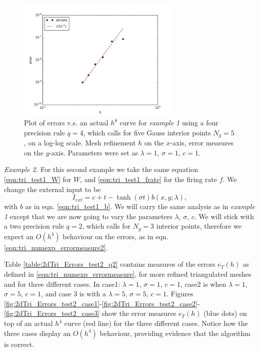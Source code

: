 \documentclass{uonmathreport}
\begin{document}
\begin{figure}[H]
	\begin{center}
		\includegraphics[width=0.7\textwidth]{Figures/2dTriTest1_q=4,Ng=5.png}
	\end{center}
	\caption{Plot of errors v.s. an actual $h^8$ curve for \textit{example 1} using a four precision rule $q=4$, which calls for five Gauss interior points $N_g=5$, on a log-log scale. Mesh refinement $h$ on the $x$-axis, error measures on the $y$-axis. Parameters were set as $\lambda=1$, $\sigma=1$, $c=1$.}
	\label{fig:2dTri_Errors_test1_q4}
\end{figure}

\textit{Example 2.} For this second example we take the same equation \ref{eqn:tri_test1_W} for $W$, and \ref{eqn:tri_test1_frate} for the firing rate $f$. We change the external input to be
\begin{equation}
	I_{ext} = c + t - \tanh(\sigma t)b(x,y;\lambda),
\end{equation}
with $b$ as in eqn. \ref{eqn:tri_test1_b}. We will carry the same analysis as in \textit{example 1} except that we are now going to vary the parameters $\lambda$, $\sigma$, $c$. We will stick with a two precision rule $q = 2$, which calls for $N_g = 3$ interior points, therefore we expect an $O(h^4)$ behaviour on the errors, as in eqn. \ref{eqn:tri_numexp_errormeasure2}.

Table \ref{table:2dTri_Errors_test2_q2} contains measures of the errors $e_T(h)$ as defined in \ref{eqn:tri_numexp_errormeasure}, for more refined triangulated meshes and for three different cases. In case1: $\lambda=1$, $\sigma=1$, $c=1$, case2 is when $\lambda=1$, $\sigma=5$, $c=1$, and case 3 is with a $\lambda=5$, $\sigma=5$, $c=1$. Figures \ref{fig:2dTri_Errors_test2_case1}-\ref{fig:2dTri_Errors_test2_case2}-\ref{fig:2dTri_Errors_test2_case3} show the error measures $e_T(h)$ (blue dots) on top of an actual $h^4$ curve (red line) for the three different cases. Notice how the three cases display an $O(h^4)$ behaviour, providing evidence that the algorithm is correct.
\end{document}
